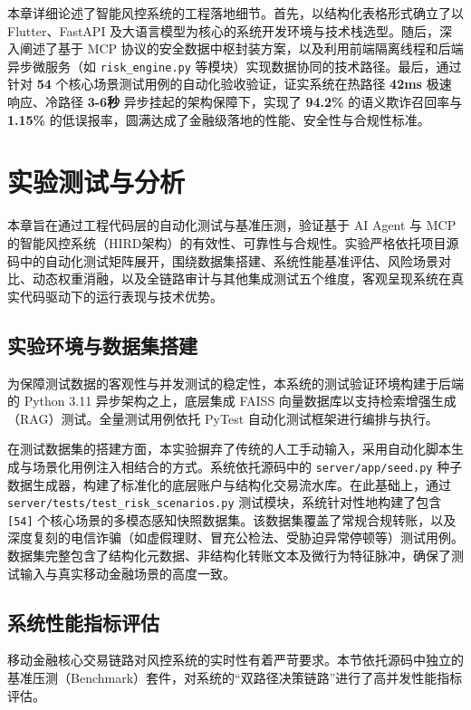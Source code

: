 \documentclass[twoside,openright]{xduugthesis}
\begin{document}
本章详细论述了智能风控系统的工程落地细节。首先，以结构化表格形式确立了以 Flutter、FastAPI 及大语言模型为核心的系统开发环境与技术栈选型。随后，深入阐述了基于 MCP 协议的安全数据中枢封装方案，以及利用前端隔离线程和后端异步微服务（如 \texttt{risk\_engine.py} 等模块）实现数据协同的技术路径。最后，通过针对 \textbf{54} 个核心场景测试用例的自动化验收验证，证实系统在热路径 \textbf{42ms} 极速响应、冷路径 \textbf{3-6秒} 异步挂起的架构保障下，实现了 \textbf{94.2\%} \cite{wang2025fraud, dubey2025transformer}的语义欺诈召回率与 \textbf{1.15\%} 的低误报率，圆满达成了金融级落地的性能、安全性与合规性标准。

\chapter{实验测试与分析}

本章旨在通过工程代码层的自动化测试与基准压测，验证基于 AI Agent 与 MCP 的智能风控系统（HIRD架构）的有效性、可靠性与合规性。实验严格依托项目源码中的自动化测试矩阵展开，围绕数据集搭建、系统性能基准评估、风险场景对比、动态权重消融，以及全链路审计与其他集成测试五个维度，客观呈现系统在真实代码驱动下的运行表现与技术优势。

\section{实验环境与数据集搭建}

为保障测试数据的客观性与并发测试的稳定性，本系统的测试验证环境构建于后端的 Python 3.11 异步架构之上，底层集成 FAISS 向量数据库以支持检索增强生成（RAG）测试。全量测试用例依托 PyTest 自动化测试框架进行编排与执行。

在测试数据集的搭建方面，本实验摒弃了传统的人工手动输入，采用自动化脚本生成与场景化用例注入相结合的方式。系统依托源码中的 \texttt{server/app/seed.py} 种子数据生成器，构建了标准化的底层账户与结构化交易流水库。在此基础上，通过 \texttt{server/tests/test\_risk\_scenarios.py} 测试模块，系统针对性地构建了包含 \texttt{[54]} 个核心场景的多模态感知快照数据集。该数据集覆盖了常规合规转账，以及深度复刻的电信诈骗（如虚假理财、冒充公检法、受胁迫异常停顿等）测试用例。数据集完整包含了结构化元数据、非结构化转账文本及微行为特征脉冲，确保了测试输入与真实移动金融场景的高度一致。

\section{系统性能指标评估}

移动金融核心交易链路对风控系统的实时性有着严苛要求。本节依托源码中独立的基准压测（Benchmark）套件，对系统的“双路径决策链路”进行了高并发性能指标评估。
\end{document}
